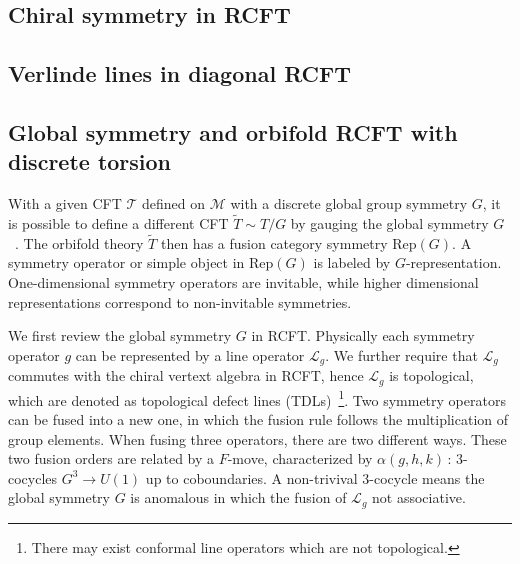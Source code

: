 \documentclass[submission, PhysLectNotes]{SciPost}
\begin{document}
\subsection{Chiral symmetry in RCFT}

\subsection{Verlinde lines in diagonal RCFT}

\subsection{Global symmetry and orbifold RCFT with discrete torsion}
With a given CFT $\mathcal{T}$ defined on $\mathcal{M}$ with a discrete global group symmetry $G$, it is possible to define a different CFT $\tilde{T} \sim T/G$ by gauging the global symmetry $G$~\cite{Douglas:aa,Gaberdiel_2000,Chang2019}. The orbifold theory $\tilde{T}$ then has a fusion category symmetry $\mathrm{Rep}(G)$. A symmetry operator or simple object in $\mathrm{Rep}(G)$ is labeled by $G$-representation. One-dimensional symmetry operators are invitable, while higher dimensional representations correspond to non-invitable symmetries. 

We first review the global symmetry $G$ in RCFT. Physically each symmetry operator $g$ can be represented by a line operator $\mathcal{L}_g$. We further require that $\mathcal{L}_g$ commutes with the chiral vertext algebra in RCFT, hence $\mathcal{L}_g$ is topological, which are denoted as topological defect lines (TDLs)~\footnote{There may exist conformal line operators which are not topological.}. Two symmetry operators can be fused into a new one, in which the fusion rule follows the multiplication of group elements. When fusing three operators, there are two different ways. These two fusion orders are related by a $F$-move, characterized by $\alpha(g,h,k)\,:\, 3$-cocycles $G^3 \rightarrow U(1)$ up to coboundaries. A non-trivival 3-cocycle means the global symmetry $G$ is anomalous in which the fusion of $\mathcal{L}_g$ not associative.
\end{document}
